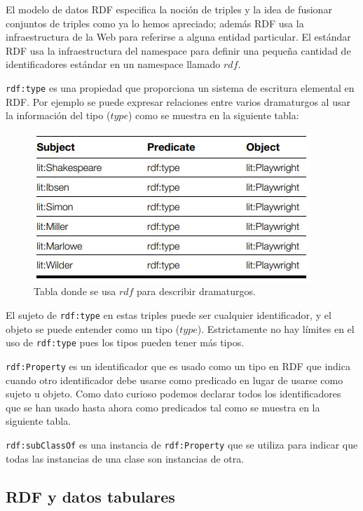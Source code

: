 \documentclass[conference]{IEEEtran}
\begin{document}
El modelo de datos RDF especifica la noción de triples y la idea de fusionar conjuntos de triples como ya lo hemos apreciado; además RDF usa la infraestructura de la Web para referirse a alguna entidad particular.
El estándar RDF usa la infraestructura del namespace para definir una pequeña cantidad de identificadores estándar en un namespace llamado $rdf$.

\texttt{rdf:type} es una propiedad que proporciona un sistema de escritura elemental en RDF. Por ejemplo se puede expresar relaciones entre varios dramaturgos al usar la información del tipo ($type$) como se muestra en la siguiente tabla:


\begin{figure}[H]
\centering
\includegraphics[scale=0.75]{img/RDF tabla type 1-1.JPG}
\caption{Tabla donde se usa $rdf$ para describir dramaturgos. \cite{b1}}
\end{figure}

El sujeto de \texttt{rdf:type} en estas triples puede ser cualquier identificador, y el objeto se puede entender como un tipo ($type$).
Estrictamente no hay límites en el uso de \texttt{rdf:type} pues los tipos pueden tener más tipos.


\texttt{rdf:Property} es un identificador que es usado como un tipo en RDF que indica cuando otro identificador debe usarse como predicado en lugar de usarse como sujeto u objeto.
Como dato curioso podemos declarar todos los identificadores que se han usado hasta ahora como predicados tal como se muestra en la siguiente tabla.

\texttt{rdf:subClassOf} es una instancia de \texttt{rdf:Property} que se utiliza para indicar que todas las instancias de una clase son instancias de otra.

\subsection{RDF y datos tabulares}
\end{document}
